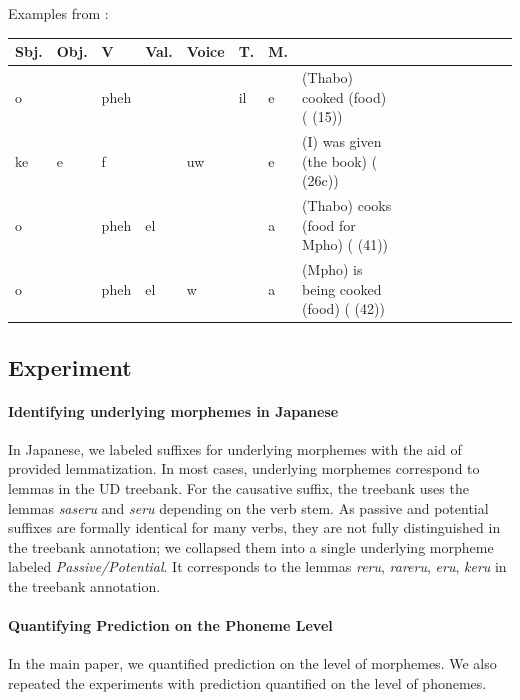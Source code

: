 \documentclass[11pt,letterpaper]{article}
\begin{document}
Examples from \cite{demuth1992acquisition}:

\begin{center}
\begin{tabular}{lllllllll|lllllll}
Sbj. & Obj. & V & Val. & Voice & T. & M. \\ \hline
o           &        & pheh &         &       & il    & e  & (Thabo) cooked (food) (\cite{demuth1992acquisition} (15)) \\
ke          & e      & f   &          & uw    &      & e   & (I) was given (the book) (\cite{demuth1992acquisition} (26c)) \\
o           &        & pheh & el      &      &       & a & (Thabo) cooks (food for Mpho) (\cite{demuth1992acquisition} (41))\\
o           &        & pheh & el      & w    &      & a & (Mpho) is being cooked (food) (\cite{demuth1992acquisition} (42))
\end{tabular}
\end{center}




\subsection{Experiment}

\paragraph{Identifying underlying morphemes in Japanese}
In Japanese, we labeled suffixes for underlying morphemes with the aid of provided lemmatization.
In most cases, underlying morphemes correspond to lemmas in the UD treebank.
For the causative suffix, the treebank uses the lemmas \textit{saseru} and \textit{seru} depending on the verb stem.
As passive and potential suffixes are formally identical for many verbs, they are not fully distinguished in the treebank annotation; we collapsed them into a single underlying morpheme labeled \textit{Passive/Potential}.
It corresponds to the lemmas \textit{reru}, \textit{rareru}, \textit{eru}, \textit{keru} in the treebank annotation.

\paragraph{Quantifying Prediction on the Phoneme Level}
In the main paper, we quantified prediction on the level of morphemes.
We also repeated the experiments with prediction quantified on the level of phonemes.
\end{document}
